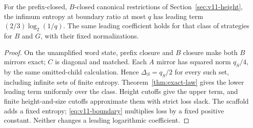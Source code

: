 \begin{corollary}\label{cor:boundary-law}
For the prefix-closed, $B$-closed canonical restrictions of Section~\ref{sec:v11-height}, the infimum entropy at boundary ratio at most $q$ has leading term $(2/3)\log_2(1/q)$. The same leading coefficient holds for that class of strategies for $B$ and $G$, with their fixed normalizations.
\end{corollary}
\begin{proof}
On the unamplified word state, prefix closure and $B$ closure make both $B$ mirrors exact; $C$ is diagonal and matched. Each $A$ mirror has squared norm $q_S/4$, by the same omitted-child calculation. Hence $\Delta_S=q_S/2$ for every such set, including infinite sets of finite entropy. Theorem~\ref{thm:exact-law} gives the lower leading term uniformly over the class. Height cutoffs give the upper term, and finite height-and-size cutoffs approximate them with strict loss slack. The scaffold adds a fixed entropy; \eqref{eq:v11-boundary} multiplies loss by a fixed positive constant. Neither changes a leading logarithmic coefficient.
\end{proof}

